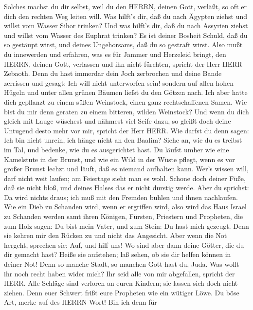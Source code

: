 Solches machst du dir selbst, weil du den HERRN, deinen Gott, verläßt,
so oft er dich den rechten Weg leiten will.  Was hilft's
dir, daß du nach Ägypten ziehst und willst vom Wasser Sihor trinken? Und
was hilft's dir, daß du nach Assyrien ziehst und willst vom Wasser des
Euphrat trinken?  Es ist deiner Bosheit Schuld, daß du so
gestäupt wirst, und deines Ungehorsams, daß du so gestraft wirst. Also
mußt du innewerden und erfahren, was es für Jammer und Herzeleid bringt,
den HERRN, deinen Gott, verlassen und ihn nicht fürchten, spricht der
Herr HERR Zebaoth.  Denn du hast immerdar dein Joch
zerbrochen und deine Bande zerrissen und gesagt: Ich will nicht
unterworfen sein! sondern auf allen hohen Hügeln und unter allen grünen
Bäumen liefst du den Götzen nach.  Ich aber hatte dich
gepflanzt zu einem süßen Weinstock, einen ganz rechtschaffenen Samen.
Wie bist du mir denn geraten zu einem bitteren, wilden Weinstock?
 Und wenn du dich gleich mit Lauge wüschest und nähmest
viel Seife dazu, so gleißt doch deine Untugend desto mehr vor mir,
spricht der Herr HERR.  Wie darfst du denn sagen: Ich bin
nicht unrein, ich hänge nicht an den Baalim? Siehe an, wie du es treibst
im Tal, und bedenke, wie du es ausgerichtet hast.  Du
läufst umher wie eine Kamelstute in der Brunst, und wie ein Wild in der
Wüste pflegt, wenn es vor großer Brunst lechzt und läuft, daß es niemand
aufhalten kann. Wer's wissen will, darf nicht weit laufen; am Feiertage
sieht man es wohl.  Schone doch deiner Füße, daß sie nicht
bloß, und deines Halses das er nicht durstig werde. Aber du sprichst: Da
wird nichts draus; ich muß mit den Fremden buhlen und ihnen nachlaufen.
 Wie ein Dieb zu Schanden wird, wenn er ergriffen wird,
also wird das Haus Israel zu Schanden werden samt ihren Königen,
Fürsten, Priestern und Propheten,  die zum Holz sagen: Du
bist mein Vater, und zum Stein: Du hast mich gezeugt. Denn sie kehren
mir den Rücken zu und nicht das Angesicht. Aber wenn die Not hergeht,
sprechen sie: Auf, und hilf uns!  Wo sind aber dann deine
Götter, die du dir gemacht hast? Heiße sie aufstehen; laß sehen, ob sie
dir helfen können in deiner Not! Denn so manche Stadt, so manchen Gott
hast du, Juda.  Was wollt ihr noch recht haben wider mich?
Ihr seid alle von mir abgefallen, spricht der HERR.  Alle
Schläge sind verloren an euren Kindern; sie lassen sich doch nicht
ziehen. Denn euer Schwert frißt eure Propheten wie ein wütiger Löwe.
 Du böse Art, merke auf des HERRN Wort! Bin ich denn für
